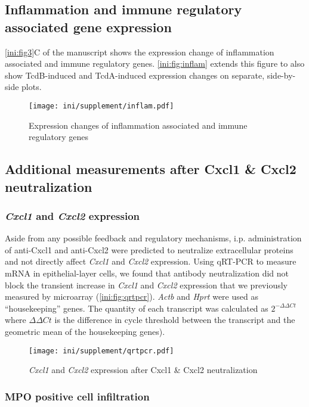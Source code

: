 \subsection{Inflammation and immune regulatory associated gene expression}

\autoref{ini:fig3}C of the manuscript shows the expression change of inflammation associated
and immune regulatory genes. \autoref{ini:fig:inflam} extends this figure to also
show TcdB-induced and TcdA-induced expression changes on separate, side-by-side
plots.

\begin{figure}[ht]
  \centering
    \texttt{[image: ini/supplement/inflam.pdf]}
  \caption{Expression changes of inflammation associated
           and immune regulatory genes}
  \label{ini:fig:inflam}
\end{figure}


\subsection{Additional measurements after Cxcl1 \& Cxcl2 neutralization}

\subsubsection{\emph{Cxcl1} and \emph{Cxcl2} expression}

Aside from any possible feedback and regulatory mechanisms, i\@.p\@. administration of anti-Cxcl1 and
anti-Cxcl2 were predicted to neutralize extracellular proteins and not directly affect 
\emph{Cxcl1} and \emph{Cxcl2} expression. Using qRT-PCR to measure mRNA
in epithelial-layer cells, we found that antibody neutralization did not block the transient
increase in \emph{Cxcl1} and \emph{Cxcl2} expression that we previously 
measured by microarray (\autoref{ini:fig:qrtpcr}). \emph{Actb} and \emph{Hprt}
were used as ``housekeeping'' genes.
The quantity of each transcript was calculated as $2^{-\Delta \Delta Ct}$ where
$\Delta \Delta Ct$ is the difference in cycle threshold between the transcript and the 
geometric mean of the housekeeping genes).

\begin{figure}[ht]
\centering
\texttt{[image: ini/supplement/qrtpcr.pdf]}
\caption{ \emph{Cxcl1} and \emph{Cxcl2} expression after Cxcl1 \& Cxcl2 neutralization }
\label{ini:fig:qrtpcr}
\end{figure}


\subsubsection{MPO positive cell infiltration}

